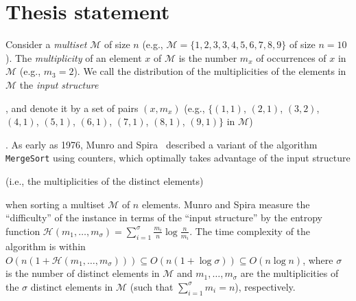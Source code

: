 \section{Thesis statement}

Consider a \emph{multiset} $\mathcal{M}$ of size $n$ (e.g.,
$\mathcal{M}=\{1,2,3,3,4,5,6,7,8,9\}$ of size $n=10$).
%
The \emph{multiplicity} of an element $x$ of $\mathcal{M}$ is the
number $m_x$ of occurrences of $x$ in $\mathcal{M}$ (e.g.,
  $m_3=2$). We call the distribution of the multiplicities
of the elements in $\mathcal{M}$ the \emph{input
  structure}\begin{LONG}
  , and denote it by a set of pairs $(x,m_x)$ (e.g., $\{(1,1)$,
  $(2,1)$, $(3,2)$, $(4,1)$, $(5,1)$, $(6,1)$, $(7,1)$, $(8,1)$,
  $(9,1)\}$ in $\mathcal{M}$)\end{LONG}.
%
As early as 1976, Munro and
Spira~\cite{1976-JComp-SortingAndSearchingInMultisets-MunroSpira}
described a variant of the algorithm {\tt{MergeSort}} using counters,
which optimally takes advantage of the input structure
\begin{LONG}
  (i.e., the multiplicities of the distinct elements)
\end{LONG}
when sorting a multiset $\mathcal{M}$ of $n$ elements. Munro and Spira
measure
the ``difficulty'' of the instance in terms of the ``input structure''
by the entropy function
$\mathcal{H}(m_1, \dots, m_\sigma) =
\sum_{i=1}^\sigma{\frac{m_i}{n}}\log{\frac{n}{m_i}}$. The time
complexity of the algorithm is within
$O(n(1 + \mathcal{H}(m_1, \dots, m_\sigma))) \subseteq
O(n(1{+}\log{\sigma})) \subseteq O(n\log{n})$, where $\sigma$ is the
number of distinct elements in $\mathcal{M}$ and
$m_1, \dots, m_\sigma$ are the multiplicities of the $\sigma$ distinct
elements in $\mathcal{M}$ (such that $\sum_{i=1}^\sigma {m_i}=n$),
respectively.

